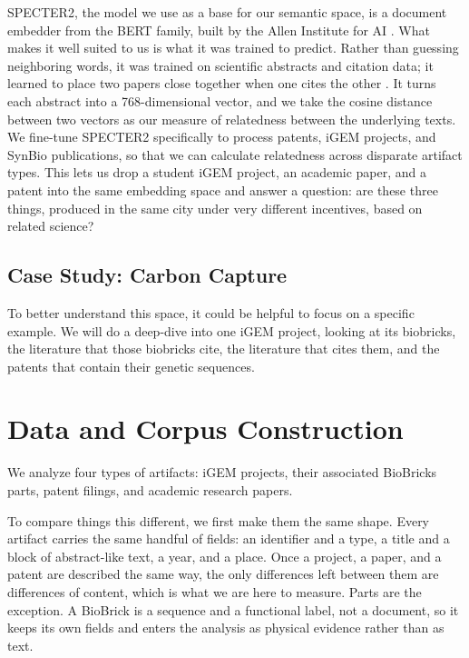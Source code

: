 \documentclass[12pt,a4paper]{article}
\begin{document}
	SPECTER2, the model we use as a base for our semantic space, is a document embedder from the BERT family, built by the Allen Institute for AI \parencite{singhSciRepEvalMultiFormat2023}. What makes it well suited to us is what it was trained to predict. Rather than guessing neighboring words, it was trained on scientific abstracts and citation data; it learned to place two papers close together when one cites the other \parencite{cohanDocumentlevelRepresentation2020}. It turns each abstract into a 768-dimensional vector, and we take the cosine distance between two vectors as our measure of relatedness between the underlying texts. We fine-tune SPECTER2 specifically to process patents, iGEM projects, and SynBio publications, so that we can calculate relatedness across disparate artifact types. This lets us drop a student iGEM project, an academic paper, and a patent into the same embedding space and answer a question: are these three things, produced in the same city under very different incentives, based on related science? 
	
	
	
	\subsection{Case Study: Carbon Capture}
	
	To better understand this space, it could be helpful to focus on a specific example. We will do a deep-dive into one iGEM project, looking at its biobricks, the literature that those biobricks cite, the literature that cites them, and the patents that contain their genetic sequences.
	
	
	\section{Data and Corpus Construction}
	
	We analyze four types of artifacts: iGEM projects, their associated BioBricks parts, patent filings, and academic research papers.

	To compare things this different, we first make them the same shape. Every artifact carries the same handful of fields: an identifier and a type, a title and a block of abstract-like text, a year, and a place. Once a project, a paper, and a patent are described the same way, the only differences left between them are differences of content, which is what we are here to measure. Parts are the exception. A BioBrick is a sequence and a functional label, not a document, so it keeps its own fields and enters the analysis as physical evidence rather than as text. 
	
\end{document}
